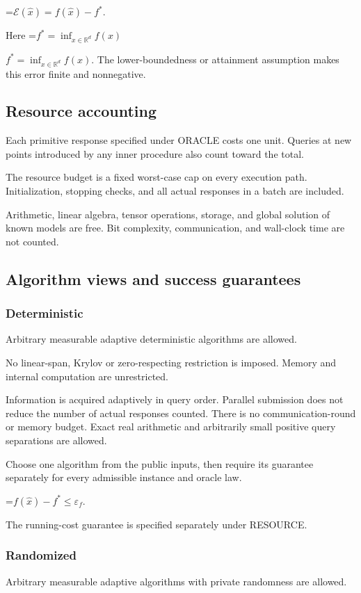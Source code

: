 \documentclass[10pt,a4paper]{article}
\newcommand{\AtlasMath}[1]{\par\begingroup\centering\setbox0=\hbox{$\displaystyle #1$}\ifdim\wd0>1.4\linewidth\typeout{ATLAS WIDE FORMULA: \the\wd0}\fi\ifdim\wd0>\linewidth\resizebox{\linewidth}{!}{\box0}\else\box0\fi\par\endgroup}
\newcommand{\AtlasInlineMath}[1]{\begingroup\setbox0=\hbox{$#1$}\ifdim\wd0>.4\linewidth\endgroup\AtlasMath{#1}\else\endgroup$#1$\fi}
\begin{document}
\AtlasMath{\mathcal{E}(\widehat{x})=f(\widehat{x})-f^*.}


Here \AtlasInlineMath{f^*=\inf_{x\in \mathbb{R}^d}f(x)}. The lower-boundedness or attainment assumption makes this error finite and nonnegative.

\subsection{Resource accounting}
Each primitive response specified under ORACLE costs one unit. Queries at new points introduced by any inner procedure also count toward the total.

The resource budget is a fixed worst-case cap on every execution path. Initialization, stopping checks, and all actual responses in a batch are included.

Arithmetic, linear algebra, tensor operations, storage, and global solution of known models are free. Bit complexity, communication, and wall-clock time are not counted.

\subsection{Algorithm views and success guarantees}
\subsubsection{Deterministic}
Arbitrary measurable adaptive deterministic algorithms are allowed.

No linear-span, Krylov or zero-respecting restriction is imposed. Memory and internal computation are unrestricted.

Information is acquired adaptively in query order. Parallel submission does not reduce the number of actual responses counted. There is no communication-round or memory budget. Exact real arithmetic and arbitrarily small positive query separations are allowed.

Choose one algorithm from the public inputs, then require its guarantee separately for every admissible instance and oracle law.


\AtlasMath{f(\widehat{x})-f^*\le \varepsilon_f.}


The running-cost guarantee is specified separately under RESOURCE.

\subsubsection{Randomized}
Arbitrary measurable adaptive algorithms with private randomness are allowed.
\end{document}
